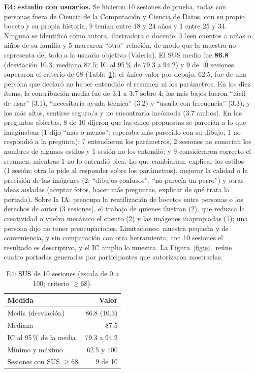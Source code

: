 \documentclass[10pt,a4paper,twocolumn]{article}
\begin{document}
\textbf{E4: estudio con usuarios.} Se hicieron 10 sesiones de prueba, todas con personas fuera de Ciencia de la Computación y Ciencia de Datos, con su propio boceto y su propia historia; 9 tenían entre 18 y 24 años y 1 entre 25 y 34. Ninguna se identificó como autora, ilustradora o docente: 5 leen cuentos a niñas o niños de su familia y 5 marcaron ``otra'' relación, de modo que la muestra no representa del todo a la usuaria objetivo (Valeria). El SUS medio fue \textbf{86.8} (desviación 10.3; mediana 87.5; IC al 95\,\% de 79.3 a 94.2) y 9 de 10 sesiones superaron el criterio de 68 (Tabla~\ref{tab:sus}); el único valor por debajo, 62.5, fue de una persona que declaró no haber entendido el resumen ni los parámetros. En los diez ítems, la contribución media fue de 3.1 a 3.7 sobre 4; los más bajos fueron ``fácil de usar'' (3.1), ``necesitaría ayuda técnica'' (3.2) y ``usarla con frecuencia'' (3.3), y los más altos, sentirse seguro/a y no encontrarla incómoda (3.7 ambos). En las preguntas abiertas, 8 de 10 dijeron que las cinco propuestas se parecían a lo que imaginaban (1 dijo ``más o menos'': esperaba más parecido con su dibujo; 1 no respondió a la pregunta); 7 entendieron los parámetros, 2 sesiones no conocían los nombres de algunos estilos y 1 sesión no los entendió; y 9 consideraron correcto el resumen, mientras 1 no lo entendió bien. Lo que cambiarían: explicar los estilos (1 sesión; otra lo pide al responder sobre los parámetros), mejorar la calidad o la precisión de las imágenes (2: ``dibujos confusos'', ``no parecía un perro'') y otras ideas aisladas (aceptar fotos, hacer más preguntas, explicar de qué trata la portada). Sobre la IA, preocupa la reutilización de bocetos entre personas o los derechos de autor (3 sesiones), el trabajo de quienes ilustran (2), que reduzca la creatividad o vuelva mecánico el cuento (2) y las imágenes inapropiadas (1); una persona dijo no tener preocupaciones. Limitaciones: muestra pequeña y de conveniencia, y sin comparación con otra herramienta; con 10 sesiones el resultado es descriptivo, y el IC amplio lo muestra. La Figura~\ref{fig:e4} reúne cuatro portadas generadas por participantes que autorizaron mostrarlas.

\begin{table}[t]
\centering\scriptsize
\caption{E4: SUS de 10 sesiones (escala de 0 a 100; criterio $\geq 68$).}\label{tab:sus}
\begin{tabular}{@{}lr@{}}
\toprule
\textbf{Medida} & \textbf{Valor}\\
\midrule
Media (desviación) & 86.8 (10.3)\\
Mediana & 87.5\\
IC al 95\,\% de la media & 79.3 a 94.2\\
Mínimo y máximo & 62.5 y 100\\
Sesiones con SUS $\geq 68$ & 9 de 10\\
\bottomrule
\end{tabular}
\end{table}
\end{document}
